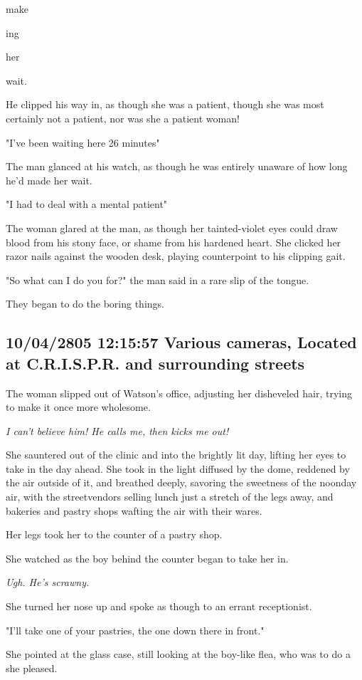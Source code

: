 \documentclass[12pt]{article}
\begin{document}
make

ing

her

wait.

He clipped his way in, as though she was a patient, though she was most certainly not a patient, nor was she a patient woman!

"I've been waiting here 26 minutes"

The man glanced at his watch, as though he was entirely unaware of how long he'd made her wait.

"I had to deal with a mental patient"

The woman glared at the man, as though her tainted-violet eyes could draw blood from his stony face, or shame from his hardened heart. She clicked her razor nails against the wooden desk, playing counterpoint to his clipping gait.

"So what can I do you for?" the man said in a rare slip of the tongue.

They began to do the boring things.

\subsection*{10/04/2805 12:15:57 Various cameras, Located at C.R.I.S.P.R. and surrounding streets}
\label{sec:orgc1e5414}

The woman slipped out of Watson's office, adjusting her disheveled hair, trying to make it once more wholesome.

\emph{I can't believe him! He calls me, then kicks me out!}

She sauntered out of the clinic and into the brightly lit day, lifting her eyes to take in the day ahead. She took in the light diffused by the dome, reddened by the air outside of it, and breathed deeply, savoring the sweetness of the noonday air, with the streetvendors selling lunch just a stretch of the legs away, and bakeries and pastry shops wafting the air with their wares.

Her legs took her to the counter of a pastry shop.

She watched as the boy behind the counter began to take her in.

\emph{Ugh. He's scrawny.}

She turned her nose up and spoke as though to an errant receptionist.

"I'll take one of your pastries, the one down there in front."

She pointed at the glass case, still looking at the boy-like flea, who was to do a she pleased.
\end{document}

